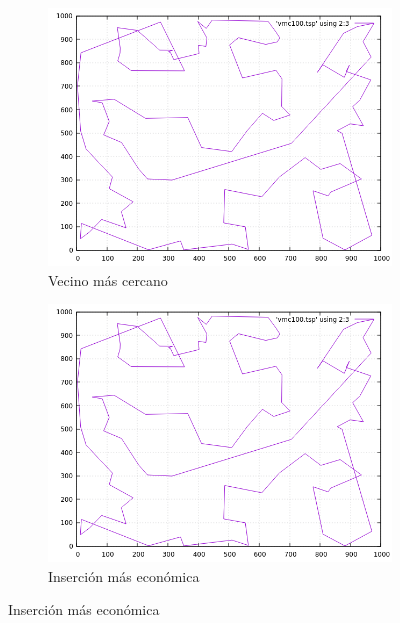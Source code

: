\documentclass[12pt,spanish]{article}
\begin{document}
\begin{figure}[H]
\centering
\begin{subfigure}[b]{0.36\textwidth}
\includegraphics[width=\textwidth]{rd100_vmc.png}
\caption{Vecino más cercano}
\end{subfigure}
\quad
\begin{subfigure}[b]{0.36\textwidth}
\includegraphics[width=\textwidth]{rd100_vmc.png}
\caption{Inserción más económica}
\end{subfigure}

\vspace{1cm}


\end{figure}
\end{document}
